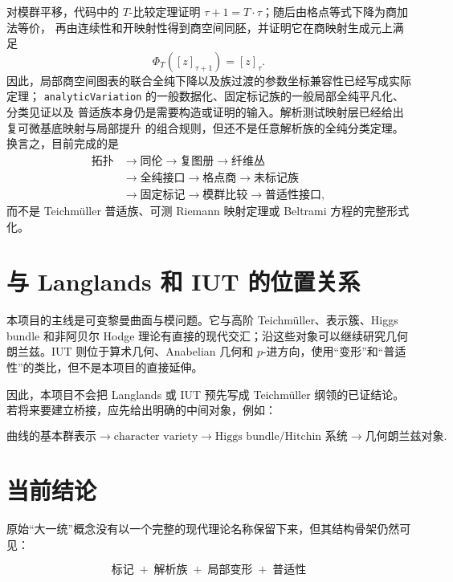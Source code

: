 \documentclass[UTF8,fontset=none,a4paper,11pt]{ctexart}
\begin{document}
对模群平移，代码中的 $T$-比较定理证明
\(\tau+1=T\mathbin{\cdot}\tau\)；随后由格点等式下降为商加法等价，
再由连续性和开映射性得到商空间同胚，并证明它在商映射生成元上满足
\[
  \Phi_T([z]_{\tau+1})=[z]_\tau.
\]
因此，局部商空间图表的联合全纯下降以及族过渡的参数坐标兼容性已经写成实际定理；
\texttt{analyticVariation} 的一般数据化、固定标记族的一般局部全纯平凡化、分类见证以及
普适族本身仍是需要构造或证明的输入。解析测试映射层已经给出复可微基底映射与局部提升
的组合规则，但还不是任意解析族的全纯分类定理。换言之，目前完成的是
\[
\begin{aligned}
\text{拓扑}&\to\text{同伦}\to\text{复图册}\to\text{纤维丛}\\
&\to\text{全纯接口}\to\text{格点商}\to\text{未标记族}\\
&\to\text{固定标记}\to\text{模群比较}\to\text{普适性接口},
\end{aligned}
\]
而不是 Teichmüller 普适族、可测 Riemann 映射定理或 Beltrami 方程的完整形式化。

\section{与 Langlands 和 IUT 的位置关系}

本项目的主线是可变黎曼曲面与模问题。它与高阶 Teichmüller、表示簇、Higgs bundle 和非阿贝尔 Hodge 理论有直接的现代交汇；沿这些对象可以继续研究几何朗兰兹。IUT 则位于算术几何、Anabelian 几何和 $p$-进方向，使用“变形”和“普适性”的类比，但不是本项目的直接延伸。

因此，本项目不会把 Langlands 或 IUT 预先写成 Teichmüller 纲领的已证结论。若将来要建立桥接，应先给出明确的中间对象，例如：

\[
  \text{曲线的基本群表示}
  \longrightarrow
  \text{character variety}
  \longrightarrow
  \text{Higgs bundle/Hitchin 系统}
  \longrightarrow
  \text{几何朗兰兹对象}.
\]

\section{当前结论}

原始“大一统”概念没有以一个完整的现代理论名称保留下来，但其结构骨架仍然可见：

\[
\boxed{
\text{标记}\;+\;\text{解析族}\;+\;\text{局部变形}\;+\;\text{普适性}
}
\]
\end{document}
